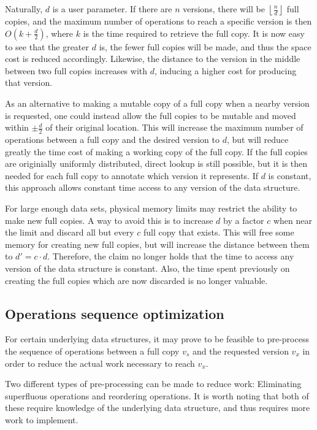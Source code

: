 Naturally, $d$ is a user parameter. If there are $n$ versions, there will be
$\left\lfloor \frac{n}{d} \right\rfloor$ full copies, and the maximum number of
operations to reach a specific version is then $O(k+\frac{d}{2})$, where $k$ is
the time required to retrieve the full copy. It is now easy to see that the
greater $d$ is, the fewer full copies will be made, and thus the space cost is
reduced accordingly. Likewise, the distance to the version in the middle between
two full copies increases with $d$, inducing a higher cost for producing that
version.

As an alternative to making a mutable copy of a full copy when a nearby version
is requested, one could instead allow the full copies to be mutable and moved
within $\pm\frac{d}{2}$ of their original location. This will increase the
maximum number of operations between a full copy and the desired version to $d$,
but will reduce greatly the time cost of making a working copy of the full copy.
If the full copies are originially uniformly distributed, direct lookup is still
possible, but it is then needed for each full copy to annotate which version it
represents. If $d$ is constant, this approach allows constant time access to any
version of the data structure.

For large enough data sets, physical memory limits may restrict the ability to
make new full copies. A way to avoid this is to increase $d$ by a factor $c$
when near the limit and discard all but every $c$ full copy that exists. This
will free some memory for creating new full copies, but will increase the
distance between them to $d' = c \cdot d$. Therefore, the claim no longer holds
that the time to access any version of the data structure is constant. Also, the
time spent previously on creating the full copies which are now discarded is no
longer valuable.

\subsection{Operations sequence optimization}
For certain underlying data structures, it may prove to be feasible to
pre-process the sequence of operations between a full copy $v_s$ and the
requested version $v_x$ in order to reduce the actual work necessary to reach
$v_x$.

Two different types of pre-processing can be made to reduce work: Eliminating
superfluous operations and reordering operations. It is worth noting that both
of these require knowledge of the underlying data structure, and thus requires
more work to implement.

